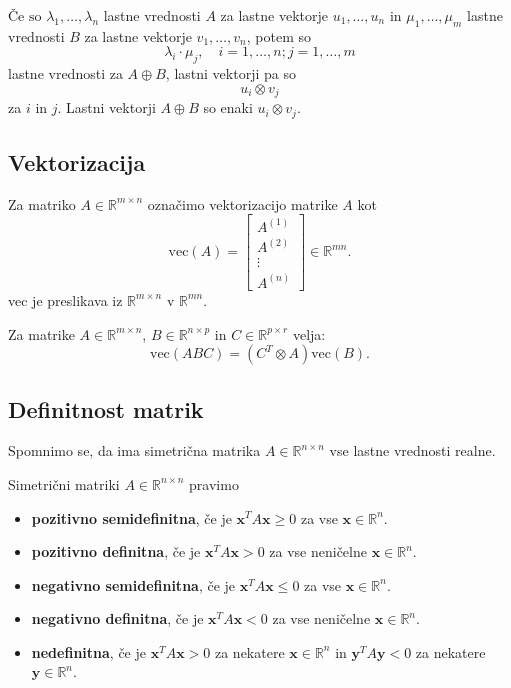 \documentclass{article}
\begin{document}
\begin{multicols}{2}
\(\text{Če so } \lambda_1, \ldots, \lambda_n \) lastne vrednosti \( A \) za lastne vektorje \( u_1, \ldots, u_n \) in \( \mu_1, \ldots, \mu_m \) lastne vrednosti \( B \) za lastne vektorje \( v_1, \ldots, v_n \), potem so
\[ \lambda_i \cdot \mu_j, \quad i = 1, \ldots, n; j = 1, \ldots, m \]
lastne vrednosti za \( A \oplus B \), lastni vektorji pa so
\[ u_i \otimes v_j \]
za \( i \) in \( j \). Lastni vektorji \( A \oplus B \) so enaki \( u_i \otimes v_j \).


\subsection{Vektorizacija}

Za matriko \( A \in \mathbb{R}^{m \times n} \) označimo vektorizacijo matrike \( A \) kot
\[
\text{vec}(A) = \begin{bmatrix}
A^{(1)} \\
A^{(2)} \\
\vdots \\
A^{(n)}
\end{bmatrix} \in \mathbb{R}^{mn}.
\]
vec je preslikava iz \( \mathbb{R}^{m \times n} \) v \( \mathbb{R}^{mn} \).

Za matrike \( A \in \mathbb{R}^{m \times n} \), \( B \in \mathbb{R}^{n \times p} \) in \( C \in \mathbb{R}^{p \times r} \) velja:
\[
\text{vec}(ABC) = (C^T \otimes A)\text{vec}(B).
\]

\subsection{Definitnost matrik}

Spomnimo se, da ima simetrična matrika \( A \in \mathbb{R}^{n \times n} \) vse lastne vrednosti realne.

Simetrični matriki \( A \in \mathbb{R}^{n \times n} \) pravimo
\begin{itemize}
  \item \textbf{pozitivno semidefinitna}, če je \( \mathbf{x}^T A \mathbf{x} \geq 0 \) za vse \( \mathbf{x} \in \mathbb{R}^n \).
  \item \textbf{pozitivno definitna}, če je \( \mathbf{x}^T A \mathbf{x} > 0 \) za vse neničelne \( \mathbf{x} \in \mathbb{R}^n \).
  \item \textbf{negativno semidefinitna}, če je \( \mathbf{x}^T A \mathbf{x} \leq 0 \) za vse \( \mathbf{x} \in \mathbb{R}^n \).
  \item \textbf{negativno definitna}, če je \( \mathbf{x}^T A \mathbf{x} < 0 \) za vse neničelne \( \mathbf{x} \in \mathbb{R}^n \).
  \item \textbf{nedefinitna}, če je \( \mathbf{x}^T A \mathbf{x} > 0 \) za nekatere \( \mathbf{x} \in \mathbb{R}^n \) in \( \mathbf{y}^T A \mathbf{y} < 0 \) za nekatere \( \mathbf{y} \in \mathbb{R}^n \).
\end{itemize}


\end{multicols}
\end{document}
